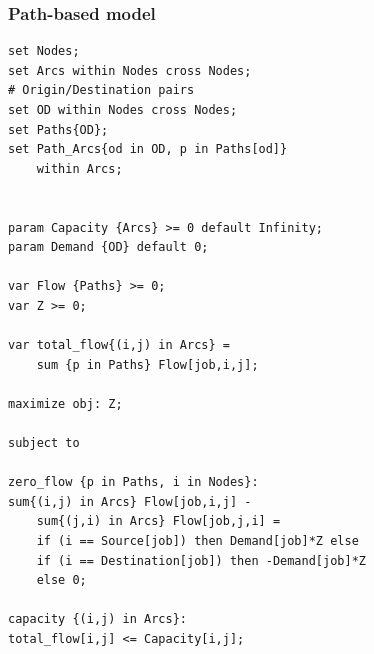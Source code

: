 \subsubsection{Path-based model}

\begingroup
\fontsize{9pt}{10pt}\selectfont

\begin{verbatim}
set Nodes;
set Arcs within Nodes cross Nodes;
# Origin/Destination pairs
set OD within Nodes cross Nodes;
set Paths{OD};
set Path_Arcs{od in OD, p in Paths[od]}
    within Arcs;


param Capacity {Arcs} >= 0 default Infinity;
param Demand {OD} default 0;

var Flow {Paths} >= 0;
var Z >= 0;

var total_flow{(i,j) in Arcs} = 
    sum {p in Paths} Flow[job,i,j];

maximize obj: Z;

subject to

zero_flow {p in Paths, i in Nodes}:
sum{(i,j) in Arcs} Flow[job,i,j] - 
    sum{(j,i) in Arcs} Flow[job,j,i] =
    if (i == Source[job]) then Demand[job]*Z else 
    if (i == Destination[job]) then -Demand[job]*Z 
    else 0;

capacity {(i,j) in Arcs}:
total_flow[i,j] <= Capacity[i,j];
\end{verbatim}

